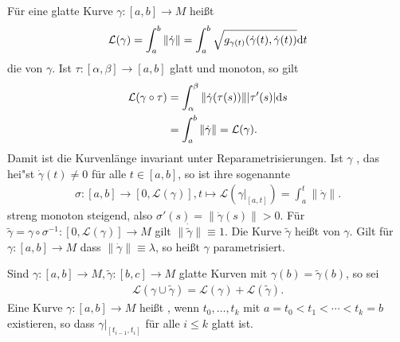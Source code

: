 Für eine glatte Kurve $\gamma \colon [a,b] \to M$ heißt
\begin{align*}
  \mathcal L(\gamma) = \int_{a}^b\|\dot \gamma\| = \int_a^b \sqrt{g_{\gamma(t)}(\dot\gamma(t),\dot\gamma(t))}\mathrm{d} t
\end{align*}
die  von $\gamma$. Ist $\tau \colon [\alpha,\beta] \to [a,b]$ glatt und monoton, so gilt
\begin{align*}
  \mathcal L(\gamma \circ \tau) & = \int_{\alpha}^{\beta}\|\dot\gamma(\tau(s))\||\tau'(s)|\mathrm{d} s\\
  & = \int_a^b\|\dot\gamma\| = \mathcal L(\gamma).
\end{align*}
Damit ist die Kurvenlänge invariant unter Reparametrisierungen. Ist $\gamma$ , das hei"st $\dot\gamma(t) \neq 0$ für alle $t \in [a,b]$, so ist ihre sogenannte 
\begin{align*}
  \sigma \colon [a,b] \to [0,\mathcal L(\gamma)], t \mapsto \mathcal L(\gamma|_{[a,t]}) = \int_a^t\|\dot\gamma\|.
\end{align*}
streng monoton steigend, also $\sigma'(s) = \|\dot\gamma(s)\| > 0$.
Für $\tilde\gamma = \gamma \circ \sigma^{-1}\colon [0,\mathcal L(\gamma)] \to M$ gilt $\|\dot{\tilde\gamma}\| \equiv 1$.
Die Kurve $\tilde \gamma$ heißt  von $\gamma$.
Gilt für $\gamma \colon [a,b] \to M$ dass $\|\dot\gamma\| \equiv \lambda$, so heißt $\gamma$  parametrisiert.

Sind $\gamma \colon [a,b] \to M, \tilde \gamma \colon [b,c] \to M$ glatte Kurven mit $\gamma(b) = \tilde \gamma(b)$, so sei
\begin{align*}
  \mathcal L(\gamma \cup \tilde\gamma) = \mathcal L(\gamma) + \mathcal L(\tilde \gamma).
\end{align*}
Eine Kurve $\gamma \colon [a,b] \to M$ heißt , wenn $t_0, \ldots, t_k$ mit $a = t_0 < t_1 < \cdots < t_k = b$ existieren, so dass $\gamma|_{[t_{i-1},t_i]}$ für alle $i \leq k$ glatt ist.

